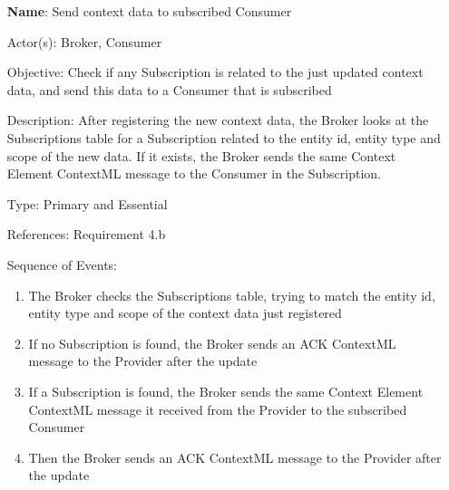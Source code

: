 \begin{itemize}
	\item[\textbf{Name}:] Send context data to subscribed Consumer
	\item[Actor(s):] Broker, Consumer
	\item[Objective:] Check if any Subscription is related to the just updated context data, and send this data to a Consumer that is subscribed
	\item[Description:] After registering the new context data, the Broker looks at the Subscriptions table for a Subscription related to the entity id, entity type and scope of the new data. If it exists, the Broker sends the same Context Element ContextML message to the Consumer in the Subscription.
	\item[Type:] Primary and Essential
	\item[References:] Requirement 4.b
	\item[Sequence of Events:]\hfill
	\begin{enumerate}
		\item The Broker checks the Subscriptions table, trying to match the entity id, entity type and scope of the context data just registered
		\item If no Subscription is found, the Broker sends an ACK ContextML message to the Provider after the update
		\item If a Subscription is found, the Broker sends the same Context Element ContextML message it received from the Provider to the subscribed Consumer
		\item Then the Broker sends an ACK ContextML message to the Provider after the update
	\end{enumerate}
\end{itemize}


